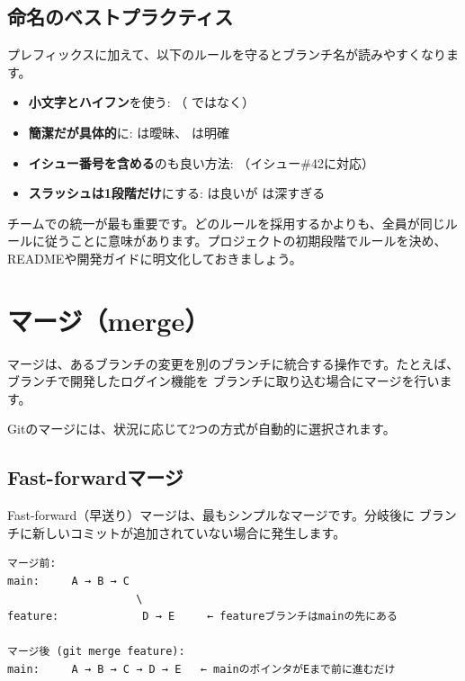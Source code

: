 \subsection{命名のベストプラクティス}

プレフィックスに加えて、以下のルールを守るとブランチ名が読みやすくなります。

\begin{itemize}
  \item \textbf{小文字とハイフン}を使う: （ ではなく）
  \item \textbf{簡潔だが具体的}に:  は曖昧、 は明確
  \item \textbf{イシュー番号を含める}のも良い方法: （イシュー\#42に対応）
  \item \textbf{スラッシュは1段階だけ}にする:  は良いが  は深すぎる
\end{itemize}

チームでの統一が最も重要です。どのルールを採用するかよりも、全員が同じルールに従うことに意味があります。プロジェクトの初期段階でルールを決め、READMEや開発ガイドに明文化しておきましょう。

\section{マージ（merge）}

マージは、あるブランチの変更を別のブランチに統合する操作です。たとえば、 ブランチで開発したログイン機能を  ブランチに取り込む場合にマージを行います。

Gitのマージには、状況に応じて2つの方式が自動的に選択されます。

\subsection{Fast-forwardマージ}

Fast-forward（早送り）マージは、最もシンプルなマージです。分岐後に  ブランチに新しいコミットが追加されていない場合に発生します。

\begin{lstlisting}[language={}]
マージ前:
main:     A → B → C
                    \
feature:             D → E     ← featureブランチはmainの先にある

マージ後 (git merge feature):
main:     A → B → C → D → E   ← mainのポインタがEまで前に進むだけ
\end{lstlisting}

